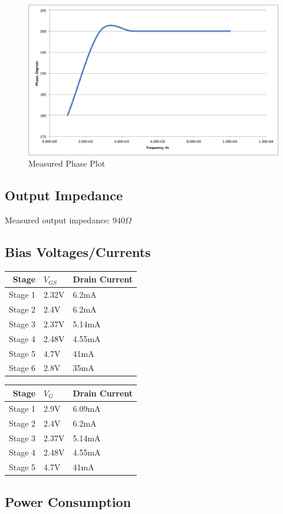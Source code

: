 \documentclass[11pt, twoside, letterpaper]{article}
\begin{document}
\begin{figure}[htbp]
\begin{center}
\includegraphics[width=7in]{measuredphase.png}
\caption{Measured Phase Plot}
\end{center}
\end{figure}
\FloatBarrier

\subsection*{Output Impedance}
Measured output impedance: $940 \Omega$
\subsection*{Bias Voltages/Currents}
\begin{tabular}{|r|l|l|}
\hline
Stage & $V_{GS}$ & Drain Current\\
\hline
Stage 1 &2.32V&6.2mA\\
Stage 2 &2.4V&6.2mA\\
Stage 3 &2.37V&5.14mA\\
Stage 4 &2.48V&4.55mA\\
Stage 5 &4.7V&41mA\\
Stage 6 &2.8V&35mA\\
\hline
\end{tabular}

\begin{tabular}{|r|l|l|}
\hline
Stage & $V_{G}$ & Drain Current\\
\hline
Stage 1 &2.9V&6.09mA\\
Stage 2 &2.4V&6.2mA\\
Stage 3 &2.37V&5.14mA\\
Stage 4 &2.48V&4.55mA\\
Stage 5 &4.7V&41mA\\
\hline
\end{tabular}


\subsection*{Power Consumption}
\end{document}
